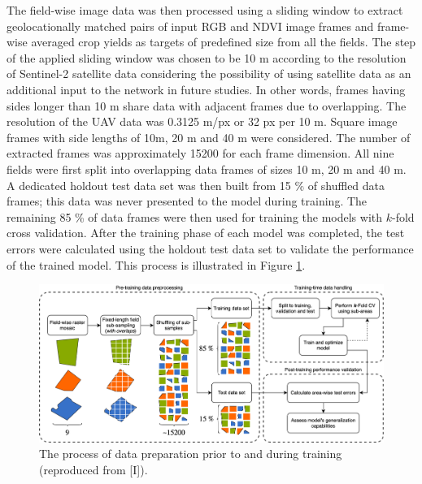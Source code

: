 The field-wise image data was then processed using a sliding window to extract geolocationally matched pairs of input RGB and NDVI image frames and frame-wise averaged crop yields as targets of predefined size from all the fields. The step of the applied sliding window was chosen to be 10 m according to the resolution of Sentinel-2 satellite data considering the possibility of using satellite data as an additional input to the network in future studies. In other words, frames having sides longer than 10 m share data with adjacent frames due to overlapping. The resolution of the UAV data was 0.3125 m/px or 32 px per 10 m. Square image frames with side lengths of 10m, 20 m and 40 m were considered. The number of extracted frames was approximately 15200 for each frame dimension. All nine fields were first split into overlapping data frames of sizes 10 m, 20 m and 40 m. A dedicated holdout test data set was then built from 15 \% of shuffled data frames; this data was never presented to the model during training. The remaining 85 \% of data frames were then used for training the models with $k$-fold cross validation. After the training phase of each model was completed, the test errors were calculated using the holdout test data set to validate the performance of the trained model. This process is illustrated in Figure \ref{fig:i-data-handling}. 

\begin{figure}[ht]
    \centering
    \includegraphics[width = \textwidth]{images/i-data-handling.png}
    \caption{The process of data preparation prior to and during training (reproduced from [I]).}
    \label{fig:i-data-handling}
\end{figure}

